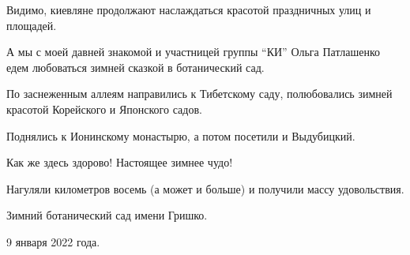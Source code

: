Видимо, киевляне продолжают наслаждаться красотой праздничных улиц и площадей.

А мы с моей давней знакомой и участницей группы \enquote{КИ} Ольга Патлашенко
едем любоваться зимней сказкой в ботанический сад.

По заснеженным аллеям  направились к Тибетскому саду, полюбовались зимней
красотой Корейского и Японского садов.


Поднялись к Ионинскому монастырю, а потом посетили и Выдубицкий.

Как же здесь здорово! Настоящее зимнее чудо!

Нагуляли километров восемь (а может и больше)  и получили массу удовольствия.

Зимний ботанический сад имени Гришко.

9 января 2022 года.

